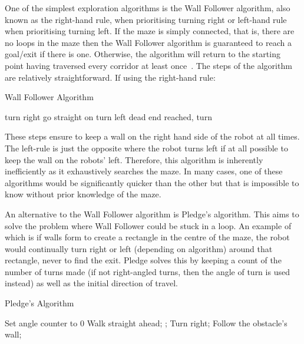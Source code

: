 One of the simplest exploration algorithms is the Wall Follower algorithm, 
also known as the right-hand rule, when prioritising turning right or 
left-hand rule when prioritising turning left. If the maze is simply 
connected, that is, there are no loops in the maze then the Wall Follower 
algorithm is guaranteed to reach a goal/exit if there is one. Otherwise, the 
algorithm will return to the starting point having traversed every corridor at 
least once~\cite{wallFollowerArcBotics}. The steps of the algorithm are 
relatively straightforward. If using the right-hand rule:

\begin{algorithm}
\caption{Wall Follower Algorithm}
\begin{algorithmic}
\REPEAT
{}
  \STATE turn right
  \STATE go straight on
  \STATE turn left
\ELSE
  \STATE dead end reached, turn 
\ENDIF
{}

\end{algorithmic}
\end{algorithm}

These steps ensure to keep a wall on the right hand side of the robot at 
all times. The left-rule is just the opposite where the robot turns left 
if at all possible to keep the wall on the robots' left. Therefore,
this algorithm is inherently inefficiently as it exhaustively searches the
maze. In many cases, one of these algorithms would be significantly quicker
than the other but that is impossible to know without prior knowledge of 
the maze.

An alternative to the Wall Follower algorithm is Pledge's algorithm. This
aims to solve the problem where Wall Follower could be stuck in a loop. An 
example of which is if walls form to create a rectangle in the centre of 
the maze, the robot would continually turn right or left (depending on
algorithm) around that rectangle, never to find the exit. Pledge solves this
by keeping a count of the number of turns made (if not right-angled turns,
then the angle of turn is used instead) as well as the initial direction of
travel. \cite{klein2011pledge}

\begin{algorithm}
\caption{Pledge's Algorithm}
\begin{algorithmic}
\STATE Set angle counter to 0
\REPEAT
\REPEAT
\STATE Walk straight ahead;
;
\STATE Turn right;
\REPEAT
\STATE Follow the obstacle's wall;
\end{algorithmic}
\end{algorithm}

